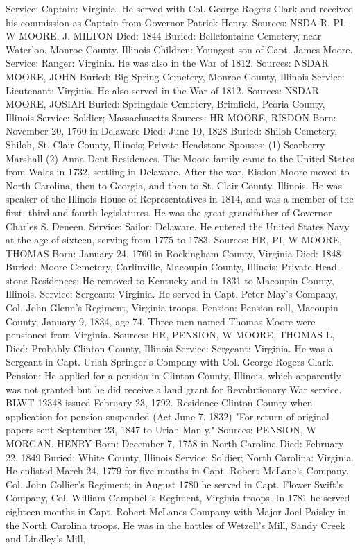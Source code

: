 Service: Captain: Virginia. He served with Col. George Rogers Clark and re­ceived his commission as Captain from Governor Patrick Henry.
Sources: NSDA R. PI, W 
MOORE, J. MILTON 
Died: 1844
Buried: Bellefontaine Cemetery, near Waterloo, Monroe County. Illinois
Children: Youngest son of Capt. James Moore.
Service: Ranger: Virginia. He was also in the War of 1812.
Sources: NSDAR 
MOORE, JOHN
Buried: Big Spring Cemetery, Monroe County, Illinois
Service: Lieutenant: Virginia. He also served in the War of 1812.
Sources: NSDAR 
MOORE, JOSIAH 
Buried: Springdale Cemetery, Brimfield, Peoria County, Illinois
Service: Soldier; Massachusetts
Sources: HR 
MOORE, RISDON 
Born: November 20, 1760 in Delaware
Died: June 10, 1828
Buried: Shiloh Cemetery, Shiloh, St. Clair County, Illinois; Private Headstone
Spouses: (1) Scarberry Marshall
	 (2) Anna Dent 
Residences. The Moore family came to the United States from Wales in 1732, settling in Delaware. After the war, Risdon Moore moved to North Carolina, then to Georgia, and then to St. Clair County, Illinois. He was speaker of the Illinois House of Representatives in 1814, and was a member of the first, third and fourth legislatures. He was the great grandfather of Governor Charles S. Deneen. 
Service: Sailor: Delaware. He entered the United States Navy at the age of six­teen, serving from 1775 to 1783. 
Sources: HR, PI, W 
MOORE, THOMAS 
Born: January 24, 1760 in Rockingham County, Virginia 
Died: 1848 
Buried: Moore Cemetery, Carlinville, Macoupin County, Illinois; Private Head­stone 
Residences: He removed to Kentucky and in 1831 to Macoupin County, Illinois. 
Service: Sergeant: Virginia. He served in Capt. Peter May's Company, Col. John Glenn's Regiment, Virginia troops. 
Pension: Pension roll, Macoupin County, January 9, 1834, age 74. Three men named Thomas Moore were pensioned from Virginia. 
Sources: HR, PENSION, W 
MOORE, THOMAS L, 
Died: Probably Clinton County, Illinois 
Service: Sergeant: Virginia. He was a Sergeant in Capt. Uriah Springer's Com­pany with Col. George Rogers Clark. 
Pension: He applied for a pension in Clinton County, Illinois, which apparently was not granted but he did receive a land grant for Revolutionary War ser­vice. BLWT 12348 issued February 23, 1792. Residence Clinton County when application for pension suspended (Act June 7, 1832) "For return of original papers sent September 23, 1847 to Uriah Manly." 
Sources: PENSION, W 
MORGAN, HENRY 
Born: December 7, 1758 in North Carolina 
Died: February 22, 1849 
Buried: White County, Illinois 
Service: Soldier; North Carolina: Virginia. He enlisted March 24, 1779 for five months in Capt. Robert McLane's Company, Col. John Collier's Regiment; in August 1780 he served in Capt. Flower Swift's Company, Col. William Campbell's Regiment, Virginia troops. In 1781 he served eighteen months in Capt. Robert McLanes Company with Major Joel Paisley in the North Caro­lina troops. He was in the battles of Wetzell's Mill, Sandy Creek and Lind­ley's Mill, 
